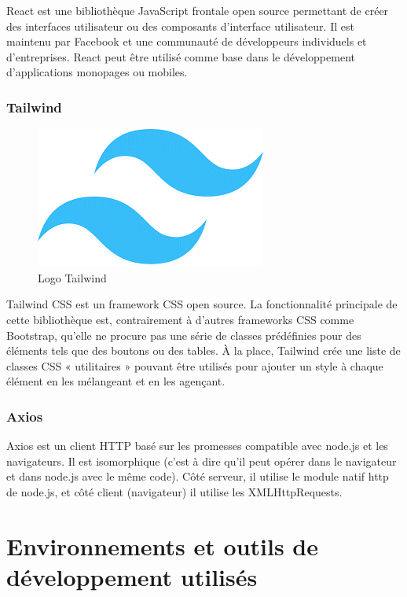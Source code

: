 React est une bibliothèque JavaScript frontale open
source permettant de créer des interfaces utilisateur ou des
composants d’interface utilisateur. Il est maintenu par Facebook et une communauté de développeurs individuels et
d’entreprises. React peut être utilisé comme base dans le développement d’applications monopages ou mobiles.

\subsubsection{Tailwind}

\begin{figure}[H]
    \centering
    \includegraphics[scale=0.5]{Logos/tailwind.png}
    \caption{Logo Tailwind}
\end{figure}

Tailwind CSS est un framework CSS open source. La fonctionnalité principale de cette bibliothèque est, contrairement à d'autres frameworks CSS comme Bootstrap, qu'elle ne procure pas une série de classes prédéfinies pour des éléments tels que des boutons ou des tables. À la place, Tailwind crée une liste de classes CSS « utilitaires » pouvant être utilisés pour ajouter un style à chaque élément en les mélangeant et en les agençant.

\subsubsection{Axios}


Axios est un client HTTP basé sur les promesses compatible avec node.js et les navigateurs. Il est isomorphique (c’est à dire qu’il peut opérer dans le navigateur et dans node.js avec le même code). Côté serveur, il utilise le module natif http de node.js, et côté client (navigateur) il utilise les XMLHttpRequests. \cite{axios}
\section{Environnements et outils de développement utilisés}

